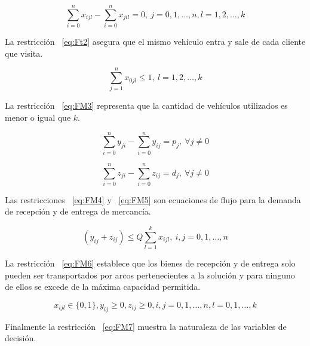 \begin{equation}\label{eq:Ft2}
\sum_{i=0}^n x_{ijl} - \sum_{i=0}^n x_{jil} = 0, \: j=0,1,…,n, l=1,2,…,k  
\end{equation}	
	
	La restricción ~\eqref{eq:Ft2} asegura que el mismo vehículo entra y sale de cada cliente que visita.


\begin{equation}\label{eq:FM3}
\sum_{j=1}^n x_{0jl} \leq 1 , \: l=1,2,…,k   
\end{equation}

	La restricción ~\eqref{eq:FM3} representa que la cantidad de vehículos utilizados es menor o igual que  $k$. 



\begin{equation}\label{eq:FM4}
\sum_{i=0}^n y_{ji} - \sum_{i=0}^n y_{ij} = p_j, \: \forall j \neq 0  
\end{equation}

\begin{equation}\label{eq:FM5}
\sum_{i=0}^n z_{ji} - \sum_{i=0}^n z_{ij} = d_j, \: \forall j \neq 0  
\end{equation}


Las restricciones ~\eqref{eq:FM4} y ~\eqref{eq:FM5} son ecuaciones de flujo para la demanda de recepción y de entrega de mercancía.


\begin{equation}\label{eq:FM6}
(y_{ij}+ z_{ij})  \leq Q \sum_{l=1}^k x_{ijl}   , \: i,j=0,1,…,n  
\end{equation}

La restricción ~\eqref{eq:FM6} establece que los bienes  de recepción y de entrega solo pueden ser transportados por arcos pertenecientes a la solución y para ninguno de ellos se excede de la máxima capacidad permitida.

\begin{equation}\label{eq:FM7}
x_{ijl}\in \lbrace0,1\rbrace,  y_{ij} \geq 0 ,z_{ij} \geq 0,   i,j=0,1,…,n,   l=0,1,…,k     
\end{equation}		

		Finalmente  la restricción ~\eqref{eq:FM7} muestra la naturaleza de las variables de decisión.

